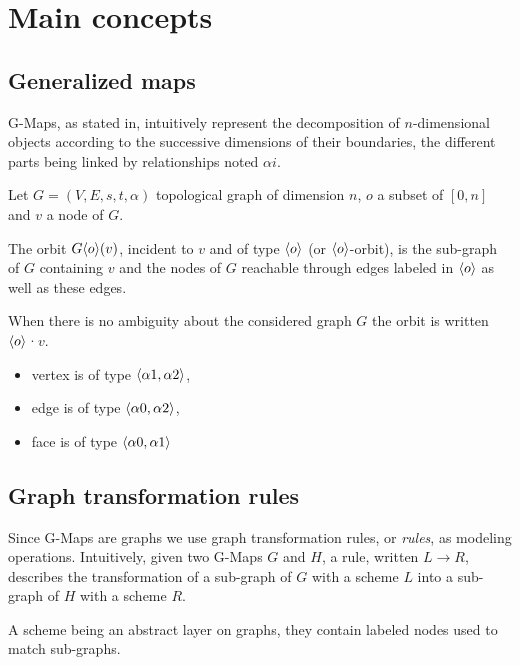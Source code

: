 \documentclass[../main.tex]{subfiles}
\begin{document}
\section{Main concepts}

\subsection[Generalized Maps]{Generalized maps}
\label{sec:generalized-maps}

G-Maps, as stated in\cite{marcheix2018persistent}, intuitively represent the
decomposition of $n$-dimensional objects according to the successive dimensions
of their boundaries, the different parts being linked by relationships noted
$\alpha i$.

\begin{definition}[Orbit]

  Let $G = (V, E, s, t, \alpha)$ topological graph of dimension $n$, $o$ a
  subset of $[0, n]$ and $v$ a node of $G$.

  The orbit $G\langle o\rangle(v)$, incident to $v$ and of type $\langle o\rangle$ (or
  $\langle o\rangle$-orbit), is the sub-graph of $G$ containing $v$ and the nodes of
  $G$ reachable through edges labeled in $\langle o\rangle$ as well as these edges.

  When there is no ambiguity about the considered graph $G$ the orbit is written
  $\langle o\rangle$·$v$.
\end{definition}

\begin{itemize}
	\item vertex is of type $\langle\alpha 1, \alpha 2\rangle$,
  \item edge is of type $\langle\alpha 0, \alpha 2\rangle$,
  \item face is of type $\langle\alpha 0, \alpha 1\rangle$
\end{itemize}


\subsection[Graph transformation rules]{Graph transformation rules}
\label{sec:graph-transf-rules}

Since G-Maps are graphs we use graph transformation rules, or \emph{rules}, as
modeling operations. Intuitively, given two G-Maps $G$ and $H$, a rule, written
$L \longrightarrow R$, describes the transformation of a sub-graph of $G$ with a
scheme $L$ into a sub-graph of $H$ with a scheme $R$.

A scheme being an abstract layer on graphs, they contain labeled nodes used to
match sub-graphs.
\end{document}

